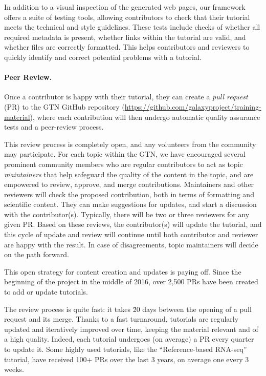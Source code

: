 In addition to a visual inspection of the generated web pages, our framework offers a suite of testing tools, allowing contributors to check that their tutorial meets the technical and style guidelines.
These tests include checks of whether all required metadata is present, whether links within the tutorial are valid, and whether files are correctly formatted.
This helps contributors and reviewers to quickly identify and correct potential problems with a tutorial.


\paragraph{Peer Review.}
Once a contributor is happy with their tutorial, they can create a \emph{pull request} (PR) to the GTN GitHub repository (\url{https://github.com/galaxyproject/training-material}), where each contribution will then undergo automatic quality assurance tests and a peer-review process.

This review process is completely open, and any volunteers from the community may participate.
For each topic within the GTN, we have encouraged several prominent community members who are regular contributors to act as topic \emph{maintainers} that help safeguard the quality of the content in the topic, and are empowered to review, approve, and merge contributions.
Maintainers and other reviewers will check the proposed contribution, both in terms of formatting and scientific content. 
They can make suggestions for updates, and start a discussion with the contributor(s). 
Typically, there will be two or three reviewers for any given PR.
Based on these reviews, the contributor(s) will update the tutorial, and this cycle of update and review will continue until both contributor and reviewer are happy with the result. In case of disagreements, topic maintainers will decide on the path forward.

This open strategy for content creation and updates is paying off.
Since the beginning of the project in the middle of 2016, over 2,500 PRs have been created to add or update tutorials. %

The review process is quite fast: it takes \~20 days between the opening of a pull request and its merge. Thanks to a fast turnaround, tutorials are regularly updated and iteratively improved over time, keeping the material relevant and of a high quality. Indeed, each tutorial undergoes (on average) a PR every quarter to update it. Some highly used tutorials, like the ``Reference-based RNA-seq'' tutorial, have received 100+ PRs over the last 3 years, on average one every 3 weeks.

